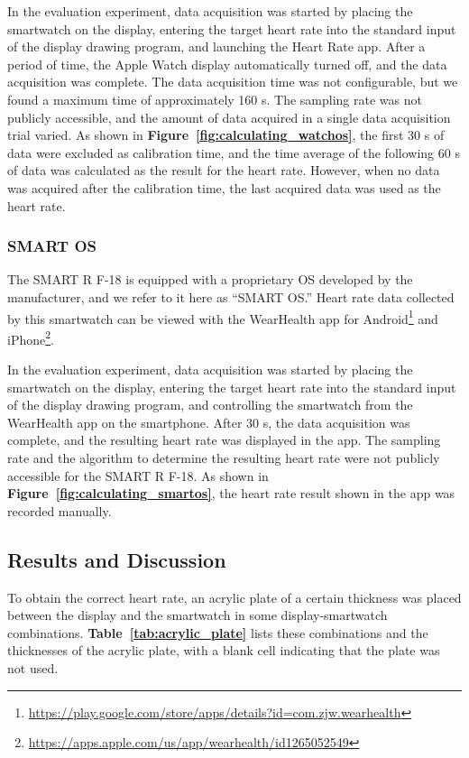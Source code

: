 \documentclass{ieeeaccess}
\newcommand\figref[1]{\textbf{Figure~\ref{fig:#1}}}
\newcommand\tabref[1]{\textbf{Table~\ref{tab:#1}}}
\begin{document}
In the evaluation experiment, data acquisition was started by placing the smartwatch on the display, entering the target heart rate into the standard input of the display drawing program, and launching the Heart Rate app. After a period of time, the Apple Watch display automatically turned off, and the data acquisition was complete. The data acquisition time was not configurable, but we found a maximum time of approximately 160 s. The sampling rate was not publicly accessible, and the amount of data acquired in a single data acquisition trial varied. As shown in \figref{calculating_watchos}, the first 30 s of data were excluded as calibration time, and the time average of the following 60 s of data was calculated as the result for the heart rate. However, when no data was acquired after the calibration time, the last acquired data was used as the heart rate.

\subsubsection{SMART OS}
The SMART R F-18 is equipped with a proprietary OS developed by the manufacturer, and we refer to it here as ``SMART OS.'' Heart rate data collected by this smartwatch can be viewed with the WearHealth app for Android\footnote{\url{https://play.google.com/store/apps/details?id=com.zjw.wearhealth}} and iPhone\footnote{\url{https://apps.apple.com/us/app/wearhealth/id1265052549}}.\par

In the evaluation experiment, data acquisition was started by placing the smartwatch on the display, entering the target heart rate into the standard input of the display drawing program, and controlling the smartwatch from the WearHealth app on the smartphone. After 30 s, the data acquisition was complete, and the resulting heart rate was displayed in the app. The sampling rate and the algorithm to determine the resulting heart rate were not publicly accessible for the SMART R F-18. As shown in \figref{calculating_smartos}, the heart rate result shown in the app was recorded manually.


\subsection{Results and Discussion}
To obtain the correct heart rate, an acrylic plate of a certain thickness was placed between the display and the smartwatch in some display-smartwatch combinations. \tabref{acrylic_plate} lists these combinations and the thicknesses of the acrylic plate, with a blank cell indicating that the plate was not used.\par
\end{document}
